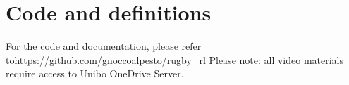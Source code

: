 \documentclass{article}
\begin{document}
\appendix
\section{Code and definitions}
\label{code}
For the code and documentation, please refer to\newline \url{https://github.com/gnoccoalpesto/rugby_rl}\newline
\underline{Please note}: all video materials require access to Unibo OneDrive Server.
\end{document}
